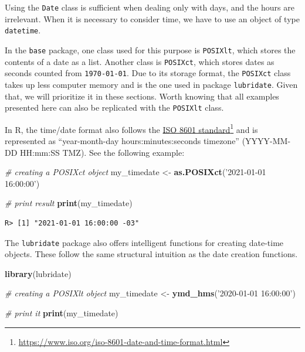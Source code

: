 \documentclass[
  12pt,
]{book}
\newenvironment{Shaded}{\begin{snugshade}}{\end{snugshade}}
\newcommand{\CommentTok}[1]{\textcolor[rgb]{0.37,0.37,0.37}{\textit{#1}}}
\newcommand{\KeywordTok}[1]{\textcolor[rgb]{0.27,0.27,0.27}{\textbf{#1}}}
\newcommand{\NormalTok}[1]{#1}
\newcommand{\StringTok}[1]{\textcolor[rgb]{0.5,0.5,0.5}{#1}}
\begin{document}
Using the \texttt{Date} class is sufficient when dealing only with days, and the hours are irrelevant. When it is necessary to consider time, we have to use an object of type \texttt{datetime}. 

In the \texttt{base} package, one class used for this purpose is \texttt{POSIXlt}, which stores the contents of a date as a list. Another class is \texttt{POSIXct}, which stores dates as seconds counted from \texttt{1970-01-01}. Due to its storage format, the \texttt{POSIXct} class takes up less computer memory and is the one used in package \texttt{lubridate}. Given that, we will prioritize it in these sections. Worth knowing that all examples presented here can also be replicated with the \texttt{POSIXlt} class.

In R, the time/date format also follows the \href{https://www.iso.org/iso-8601-date-and-time-format.html}{ISO 8601 standard}\footnote{\url{https://www.iso.org/iso-8601-date-and-time-format.html}} and is represented as ``year-month-day hours:minutes:seconds timezone'' (YYYY-MM-DD HH:mm:SS TMZ). See the following example:

\begin{Shaded}
\begin{Highlighting}[]
\CommentTok{# creating a POSIXct object}
\NormalTok{my_timedate <-}\StringTok{ }\KeywordTok{as.POSIXct}\NormalTok{(}\StringTok{'2021-01-01 16:00:00'}\NormalTok{)}

\CommentTok{# print result}
\KeywordTok{print}\NormalTok{(my_timedate)}
\end{Highlighting}
\end{Shaded}

\begin{verbatim}
R> [1] "2021-01-01 16:00:00 -03"
\end{verbatim}

The \texttt{lubridate} package also offers intelligent functions for creating date-time objects. These follow the same structural intuition as the date creation functions.

\begin{Shaded}
\begin{Highlighting}[]
\KeywordTok{library}\NormalTok{(lubridate)}

\CommentTok{# creating a POSIXlt object}
\NormalTok{my_timedate <-}\StringTok{ }\KeywordTok{ymd_hms}\NormalTok{(}\StringTok{'2020-01-01 16:00:00'}\NormalTok{)}

\CommentTok{# print it}
\KeywordTok{print}\NormalTok{(my_timedate)}
\end{Highlighting}
\end{Shaded}
\end{document}
